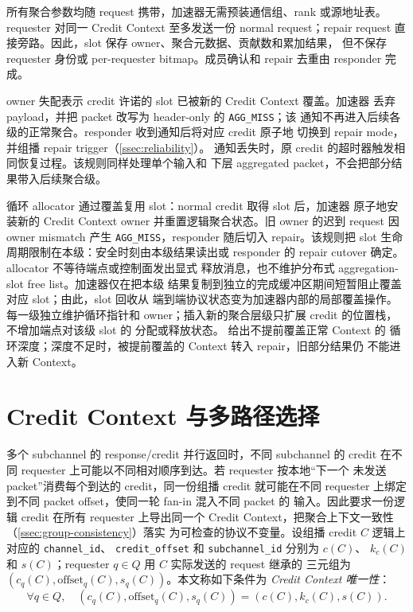 所有聚合参数均随 request 携带，加速器无需预装通信组、rank 或源地址表。
requester 对同一 Credit Context 至多发送一份 normal request；repair
request 直接旁路。因此，slot 保存 owner、聚合元数据、贡献数和累加结果，
但不保存 requester 身份或 per-requester bitmap。成员确认和 repair 去重由
responder 完成。

owner 失配表示 credit 许诺的 slot 已被新的 Credit Context 覆盖。加速器
丢弃 payload，并把 packet 改写为 header-only 的 \texttt{AGG\_MISS}；该
通知不再进入后续各级的正常聚合。responder 收到通知后将对应 credit 原子地
切换到 repair mode，并组播 repair trigger（\cref{ssec:reliability}）。
通知丢失时，原 credit 的超时器触发相同恢复过程。该规则同样处理单个输入和
下层 aggregated packet，不会把部分结果带入后续聚合级。

循环 allocator 通过覆盖复用 slot：normal credit 取得 slot 后，加速器
原子地安装新的 Credit Context owner 并重置逻辑聚合状态。旧 owner 的迟到
request 因 owner mismatch 产生 \texttt{AGG\_MISS}，responder 随后切入
repair。该规则把 slot 生命周期限制在本级：安全时刻由本级结果读出或
responder 的 repair cutover 确定。allocator 不等待端点或控制面发出显式
释放消息，也不维护分布式 aggregation-slot free list。加速器仅在把本级
结果复制到独立的完成缓冲区期间短暂阻止覆盖对应 slot；由此，slot 回收从
端到端协议状态变为加速器内部的局部覆盖操作。每一级独立维护循环指针和
owner；插入新的聚合层级只扩展 credit 的位置栈，不增加端点对该级 slot 的
分配或释放状态。 给出不提前覆盖正常 Context 的
循环深度；深度不足时，被提前覆盖的 Context 转入 repair，旧部分结果仍
不能进入新 Context。

\section{Credit Context 与多路径选择}
\label{ssec:response-credit}
\label{ssec:packet-binding}

多个 subchannel 的 response/credit 并行返回时，不同 subchannel 的 credit
在不同 requester 上可能以不同相对顺序到达。若 requester 按本地``下一个
未发送 packet''消费每个到达的 credit，同一份组播 credit 就可能在不同
requester 上绑定到不同 packet offset，使同一轮 fan-in 混入不同 packet 的
输入。\sysname 因此要求一份逻辑 credit 在所有 requester 上导出同一个
Credit Context，把聚合上下文一致性（\cref{ssec:group-consistency}）落实
为可检查的协议不变量。设组播 credit $C$ 逻辑上对应的 \texttt{channel\_id}、
\texttt{credit\_offset} 和 \texttt{subchannel\_id} 分别为 $c(C)$、
$k_c(C)$ 和 $s(C)$；requester $q \in Q$ 用 $C$ 实际发送的 request 继承的
三元组为 $(c_q(C), \mathrm{offset}_q(C), s_q(C))$。本文称如下条件为
\emph{Credit Context 唯一性}：
\begin{equation}
    \forall q \in Q,\quad
    (c_q(C), \mathrm{offset}_q(C), s_q(C))
    =
    (c(C), k_c(C), s(C)).
    \label{eq:credit-context-uniqueness}
\end{equation}

